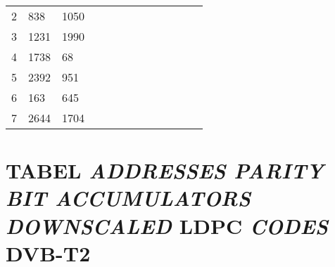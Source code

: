 \begin{table}[tb]
\begin{tabular}{|l|l|l|llllllllll}
		2 & 838  & 1050 &                           &                          &                          &                          &                           &                          &                           &                           &                           &                           \\ \cline{1-3}
		3 & 1231 & 1990 &                           &                          &                          &                          &                           &                          &                           &                           &                           &                           \\ \cline{1-3}
		4 & 1738 & 68   &                           &                          &                          &                          &                           &                          &                           &                           &                           &                           \\ \cline{1-3}
		5 & 2392 & 951  &                           &                          &                          &                          &                           &                          &                           &                           &                           &                           \\ \cline{1-3}
		6 & 163  & 645  &                           &                          &                          &                          &                           &                          &                           &                           &                           &                           \\ \cline{1-3}
		7 & 2644 & 1704 &                           &                          &                          &                          &                           &                          &                           &                           &                           &                           \\ \cline{1-3}
	\end{tabular}
	
	
\end{table}

\chapter{TABEL \textit{ADDRESSES PARITY BIT ACCUMULATORS DOWNSCALED} LDPC \textit{CODES} DVB-T2}

\setcounter{table}{0}
\renewcommand{\thetable}{B.\arabic{table}}


